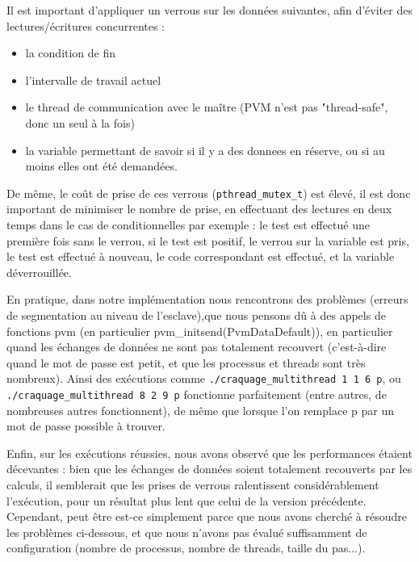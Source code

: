 \documentclass[a4paper,11pt]{article}
\begin{document}
Il est important d'appliquer un verrous sur les données suivantes, afin d'éviter des lectures/écritures concurrentes :
\begin{itemize}
\item la condition de fin 
\item l'intervalle de travail actuel
\item le thread de communication avec le maître (PVM n'est pas "thread-safe", donc un seul à la fois)
\item la variable permettant de savoir si il y a des donnees en réserve, ou si au moins elles ont été demandées.
\end{itemize}
De même, le coût de prise de ces verrous (\texttt{pthread_mutex_t}) est élevé, il est donc important de minimiser le nombre de prise, en effectuant des lectures en deux temps dans le cas de conditionnelles par exemple :
le test est effectué une première fois sans le verrou, si le test est positif, le verrou sur la variable est pris, le test est effectué à nouveau, le code correspondant est effectué, et la variable déverrouillée.

En pratique, dans notre implémentation nous rencontrons des problèmes (erreurs de segmentation au niveau de l'esclave),que nous pensons dû à des appels de fonctions pvm (en particulier pvm_initsend(PvmDataDefault)), en particulier quand les échanges de données ne sont pas totalement recouvert (c'est-à-dire quand le mot de passe est petit, et que les processus et threads sont très nombreux).
Ainsi des exécutions comme \texttt{./craquage_multithread 1 1 6 p}, ou \texttt{./craquage_multithread 8 2 9 p} fonctionne parfaitement (entre autres, de nombreuses autres fonctionnent), de même que lorsque l'on remplace p par un mot de passe possible à trouver.


Enfin, sur les exécutions réussies, nous avons observé que les performances étaient décevantes : bien que les échanges de données soient totalement recouverts par les calculs, il semblerait que les prises de verrous ralentissent considérablement l'exécution, pour un résultat plus lent que celui de la version précédente.
Cependant, peut être est-ce simplement parce que nous avons cherché à résoudre les problèmes ci-dessous, et que nous n'avons pas évalué suffisamment de configuration (nombre de processus, nombre de threads, taille du pas...).
\end{document}
